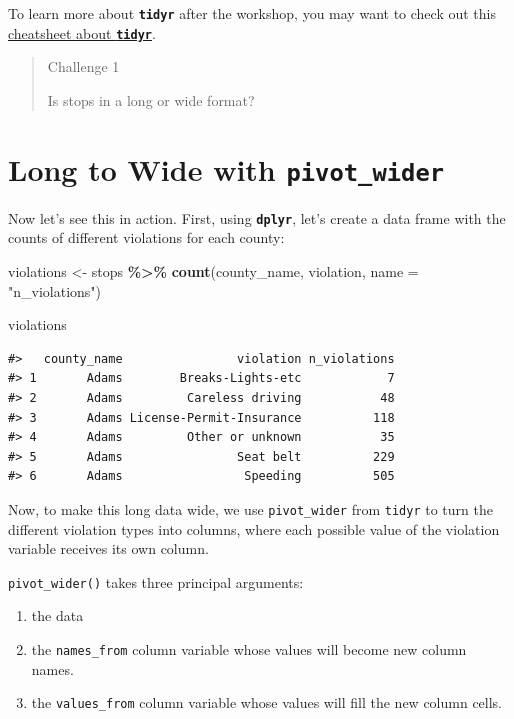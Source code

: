 \documentclass[
]{book}
\newenvironment{Shaded}{\begin{snugshade}}{\end{snugshade}}
\newcommand{\AttributeTok}[1]{\textcolor[rgb]{0.13,0.29,0.53}{#1}}
\newcommand{\FunctionTok}[1]{\textcolor[rgb]{0.13,0.29,0.53}{\textbf{#1}}}
\newcommand{\NormalTok}[1]{#1}
\newcommand{\OtherTok}[1]{\textcolor[rgb]{0.56,0.35,0.01}{#1}}
\newcommand{\SpecialCharTok}[1]{\textcolor[rgb]{0.81,0.36,0.00}{\textbf{#1}}}
\newcommand{\StringTok}[1]{\textcolor[rgb]{0.31,0.60,0.02}{#1}}
\providecommand{\tightlist}{%
  \setlength{\itemsep}{0pt}\setlength{\parskip}{0pt}}
\begin{document}
To learn more about \textbf{\texttt{tidyr}} after the workshop, you may want to check out this \href{https://raw.githubusercontent.com/rstudio/cheatsheets/main/tidyr.pdf}{cheatsheet about \textbf{\texttt{tidyr}}}.

\begin{quote}
Challenge 1

Is stops in a long or wide format?
\end{quote}

\hypertarget{long-to-wide-with-pivot_wider}{%
\section{\texorpdfstring{Long to Wide with \texttt{pivot\_wider}}{Long to Wide with pivot\_wider}}\label{long-to-wide-with-pivot_wider}}

Now let's see this in action. First, using \textbf{\texttt{dplyr}}, let's create a data frame with the counts of different violations for each county:

\begin{Shaded}
\begin{Highlighting}[]
\NormalTok{violations }\OtherTok{\textless{}{-}}\NormalTok{ stops }\SpecialCharTok{\%\textgreater{}\%}
  \FunctionTok{count}\NormalTok{(county\_name, violation, }\AttributeTok{name =} \StringTok{"n\_violations"}\NormalTok{)}

\NormalTok{violations}
\end{Highlighting}
\end{Shaded}

\begin{verbatim}
#>   county_name                violation n_violations
#> 1       Adams        Breaks-Lights-etc            7
#> 2       Adams         Careless driving           48
#> 3       Adams License-Permit-Insurance          118
#> 4       Adams         Other or unknown           35
#> 5       Adams                Seat belt          229
#> 6       Adams                 Speeding          505
\end{verbatim}

Now, to make this long data wide, we use \texttt{pivot\_wider} from \texttt{tidyr} to turn the different violation types into columns, where each possible value of the violation variable receives its own column.

\texttt{pivot\_wider()} takes three principal arguments:

\begin{enumerate}
\def\labelenumi{\arabic{enumi}.}
\tightlist
\item
  the data
\item
  the \texttt{names\_from} column variable whose values will become new column names.
\item
  the \texttt{values\_from} column variable whose values will fill the new column cells.
\end{enumerate}
\end{document}
